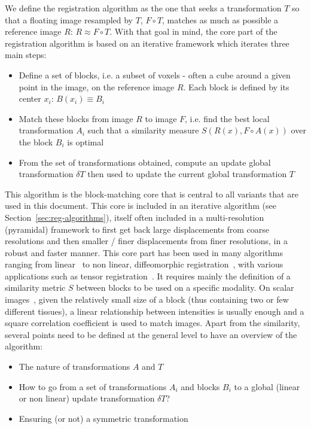 \documentclass[a4paper]{article}
\begin{document}
We define the registration algorithm as the one that seeks a transformation $T$ so that a floating image resampled by $T$, $F \circ T$, matches as much as possible a reference image $R$: $R \approx F \circ T$. With that goal in mind, the core part of the registration algorithm is based on an iterative framework which iterates three main steps:

\begin{itemize}
	\item Define a set of blocks, i.e. a subset of voxels - often a cube around a given point in the image, on the reference image $R$. Each block is defined by its center $x_i$: $B(x_i) \equiv B_i$
	\item Match these blocks from image $R$ to image $F$, i.e. find the best local transformation $A_i$ such that a similarity measure $S(R(x), F \circ A(x))$ over the block $B_i$ is optimal
	\item From the set of transformations obtained, compute an update global transformation $\delta T$ then used to update the current global transformation $T$
\end{itemize}

This algorithm is the block-matching core that is central to all variants that are used in this document. This core is included in an iterative algorithm (see Section~\ref{sec:reg-algorithms}), itself often included in a multi-resolution (pyramidal) framework to first get back large displacements from coarse resolutions and then smaller / finer displacements from finer resolutions, in a robust and faster manner. This core part has been used in many algorithms ranging from linear~\cite{Ourselin_Miccai_2000,commowick:inserm-00681610} to non linear, diffeomorphic registration~\cite{Commowick_Miccai_2012}, with various applications such as tensor registration~\cite{suarez:inserm-00657707}. It requires mainly the definition of a similarity metric $S$ between blocks to be used on a specific modality. On scalar images~\cite{Malandain_Neuroimage_2004}, given the relatively small size of a block (thus containing two or few different tissues), a linear relationship between intensities is usually enough and a square correlation coefficient is used to match images. Apart from the similarity, several points need to be defined at the general level to have an overview of the algorithm:

\begin{itemize}
 	\item The nature of transformations $A$ and $T$
 	\item How to go from a set of transformations $A_i$ and blocks $B_i$ to a global (linear or non linear) update transformation $\delta T$?
 	\item Ensuring (or not) a symmetric transformation
 \end{itemize}
\end{document}
